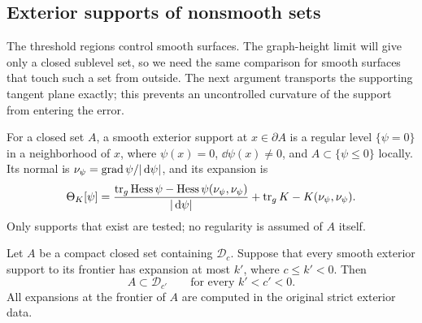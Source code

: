 \subsection{Exterior supports of nonsmooth sets}

The threshold regions control smooth surfaces.  The graph-height limit
will give only a closed sublevel set, so we need the same comparison for
smooth surfaces that touch such a set from outside.  The next argument
transports the supporting tangent plane exactly; this prevents an
uncontrolled curvature of the support from entering the error.

For a closed set \(A\), a smooth exterior support at
\(x\in\partial A\) is a regular level \(\{\psi=0\}\) in a
neighborhood of \(x\), where \(\psi(x)=0\), \(\dd\psi(x)\ne0\),
and \(A\subset\{\psi\le0\}\) locally.  Its normal is
\(\nu_\psi=\operatorname{grad}\psi/|\,\mathrm d\psi|\), and its expansion is
\begin{equation}
 \Theta_K[\psi]
 =\frac{\operatorname{tr}_g\operatorname{Hess}\psi-\operatorname{Hess}\psi(\nu_\psi,\nu_\psi)}
              {|\,\mathrm d\psi|}
      +\operatorname{tr}_gK-K(\nu_\psi,\nu_\psi).
\label{four:maximal:prep:support-expansion}
\end{equation}
Only supports that exist are tested; no regularity is assumed of
\(A\) itself.

\begin{lemma}
\label{four:maximal:lem:support-enclosure}
Let \(A\) be a compact closed set containing \(\mathcal D_c\).
Suppose that every smooth exterior support to its frontier has
expansion at most \(k'\), where \(c\le k'<0\).  Then
\[
 A\subset\mathcal D_{c'}\qquad\text{for every }k'<c'<0.
\]
All expansions at the frontier of \(A\) are computed in the
original strict exterior data.
\end{lemma}

